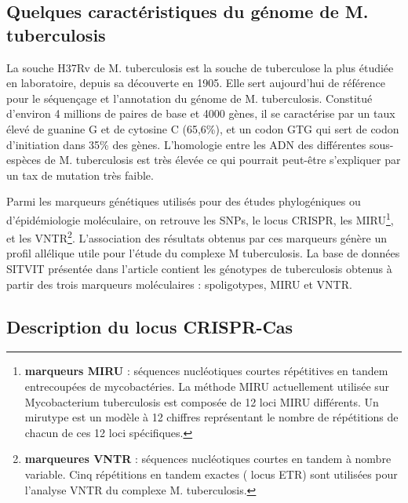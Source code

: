 \documentclass[twoside,a4paper,11pt,frenchb,openany]{report}
\begin{document}
\subsection{Quelques caractéristiques du génome de M. tuberculosis}

La souche H37Rv de M. tuberculosis est la souche de tuberculose la plus étudiée en laboratoire, depuis sa découverte en 1905. Elle sert aujourd'hui de référence pour le séquençage et l'annotation du génome de M. tuberculosis. Constitué d'environ 4 millions de paires de base et 4000 gènes, il se caractérise par un taux élevé de guanine G et de cytosine C (65,6\%), et un codon GTG qui sert de codon d'initiation dans 35\% des gènes. L'homologie entre les ADN des différentes sous-espèces de M. tuberculosis est très élevée ce qui pourrait peut-être s'expliquer par un tax de mutation très faible.

Parmi les marqueurs génétiques utilisés pour des études phylogéniques ou d'épidémiologie moléculaire, on retrouve les SNPs, le locus CRISPR, les MIRU\footnote{\textbf{marqueurs MIRU} : séquences nucléotiques courtes répétitives en tandem entrecoupées de mycobactéries. La méthode MIRU actuellement utilisée sur Mycobacterium tuberculosis est composée de 12 loci MIRU différents. Un mirutype est un modèle à 12 chiffres représentant le nombre de répétitions de chacun de ces 12 loci spécifiques.}, et les VNTR\footnote{\textbf{marqueures VNTR} : séquences nucléotiques courtes en tandem à nombre variable. Cinq répétitions en tandem exactes ( locus ETR) sont utilisées pour l'analyse VNTR du complexe M. tuberculosis.}. L'association des résultats obtenus par ces marqueurs génère un profil allélique utile pour l'étude du complexe M tuberculosis. La base de données SITVIT présentée dans l'article\cite{demay} contient les génotypes de tuberculosis obtenus à partir des trois marqueurs moléculaires : spoligotypes, MIRU et VNTR.


\subsection{Description du locus CRISPR-Cas}
\end{document}
